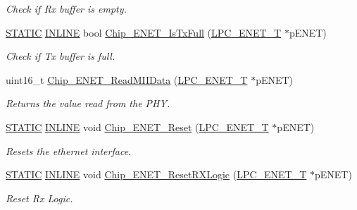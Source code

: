 \begin{DoxyCompactItemize}
\begin{DoxyCompactList}\small\item\em Check if Rx buffer is empty. \end{DoxyCompactList}\item 
\hyperlink{group__LPC__Types__Public__Macros_ga10b2d890d871e1489bb02b7e70d9bdfb}{S\+T\+A\+T\+IC} \hyperlink{group__LPC__Types__Public__Types_ga2eb6f9e0395b47b8d5e3eeae4fe0c116}{I\+N\+L\+I\+NE} bool \hyperlink{group__ENET__17XX__40XX_ga593f01cc1a9e665c8c3293c0599b254c}{Chip\+\_\+\+E\+N\+E\+T\+\_\+\+Is\+Tx\+Full} (\hyperlink{structLPC__ENET__T}{L\+P\+C\+\_\+\+E\+N\+E\+T\+\_\+T} $\ast$p\+E\+N\+ET)
\begin{DoxyCompactList}\small\item\em Check if Tx buffer is full. \end{DoxyCompactList}\item 
uint16\+\_\+t \hyperlink{group__ENET__17XX__40XX_gab6d3dfc1cc671503532d00947f236e1d}{Chip\+\_\+\+E\+N\+E\+T\+\_\+\+Read\+M\+I\+I\+Data} (\hyperlink{structLPC__ENET__T}{L\+P\+C\+\_\+\+E\+N\+E\+T\+\_\+T} $\ast$p\+E\+N\+ET)
\begin{DoxyCompactList}\small\item\em Returns the value read from the P\+HY. \end{DoxyCompactList}\item 
\hyperlink{group__LPC__Types__Public__Macros_ga10b2d890d871e1489bb02b7e70d9bdfb}{S\+T\+A\+T\+IC} \hyperlink{group__LPC__Types__Public__Types_ga2eb6f9e0395b47b8d5e3eeae4fe0c116}{I\+N\+L\+I\+NE} void \hyperlink{group__ENET__17XX__40XX_gae6567d8fb1d427ecf30ce65f48a074b4}{Chip\+\_\+\+E\+N\+E\+T\+\_\+\+Reset} (\hyperlink{structLPC__ENET__T}{L\+P\+C\+\_\+\+E\+N\+E\+T\+\_\+T} $\ast$p\+E\+N\+ET)
\begin{DoxyCompactList}\small\item\em Resets the ethernet interface. \end{DoxyCompactList}\item 
\hyperlink{group__LPC__Types__Public__Macros_ga10b2d890d871e1489bb02b7e70d9bdfb}{S\+T\+A\+T\+IC} \hyperlink{group__LPC__Types__Public__Types_ga2eb6f9e0395b47b8d5e3eeae4fe0c116}{I\+N\+L\+I\+NE} void \hyperlink{group__ENET__17XX__40XX_gaddd915f4c5b177bef0cd29d882ed3e6f}{Chip\+\_\+\+E\+N\+E\+T\+\_\+\+Reset\+R\+X\+Logic} (\hyperlink{structLPC__ENET__T}{L\+P\+C\+\_\+\+E\+N\+E\+T\+\_\+T} $\ast$p\+E\+N\+ET)
\begin{DoxyCompactList}\small\item\em Reset Rx Logic. \end{DoxyCompactList}\item 

\end{DoxyCompactItemize}
